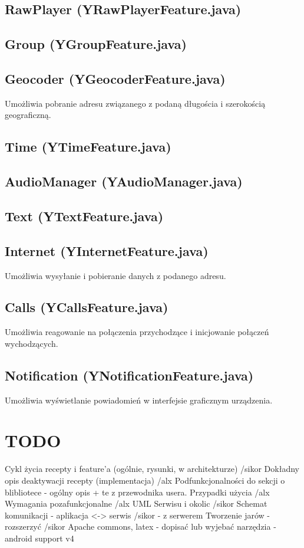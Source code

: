 \documentclass[11pt,a4paper,polish,thesis]{dcsbook}
\begin{document}
\subsection{RawPlayer (YRawPlayerFeature.java)}

\subsection{Group (YGroupFeature.java)}

\subsection{Geocoder (YGeocoderFeature.java)}
Umożliwia pobranie adresu związanego z podaną długościa i szerokością geograficzną.

\subsection{Time (YTimeFeature.java)}

\subsection{AudioManager (YAudioManager.java)}

\subsection{Text (YTextFeature.java)}

\subsection{Internet (YInternetFeature.java)}
Umożliwia wysyłanie i pobieranie danych z podanego adresu.

\subsection{Calls (YCallsFeature.java)}
Umożliwia reagowanie na połączenia przychodzące i inicjowanie połączeń wychodzących.

\subsection{Notification (YNotificationFeature.java)}
Umożliwia wyświetlanie powiadomień w interfejsie graficznym urządzenia.

\section{TODO}
Cykl życia recepty i feature'a (ogólnie, rysunki, w architekturze) /sikor
Dokładny opis deaktywacji recepty (implementacja) /alx
Podfunkcjonalności do sekcji o blibliotece - ogólny opis + te z przewodnika usera. 
Przypadki użycia /alx
Wymagania pozafunkcjonalne /alx
UML Serwisu i okolic /sikor
Schemat komunikacji 
- aplikacja <-> serwis /sikor
- z serwerem 
Tworzenie jarów - rozszerzyć /sikor
Apache commons, latex - dopisać lub wyjebać
narzędzia - android support v4
\end{document}
